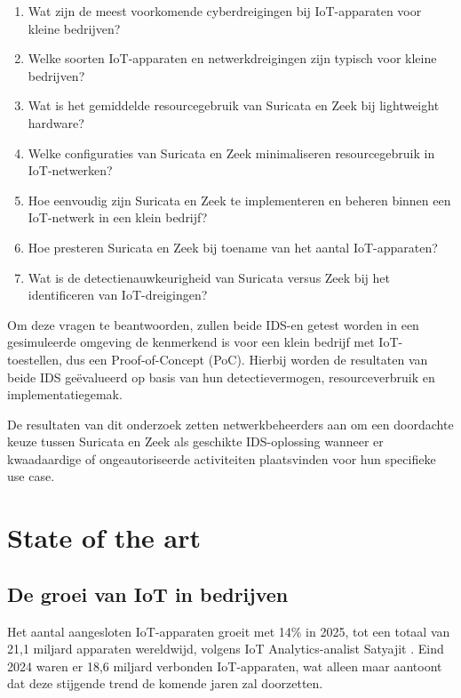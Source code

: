 \begin{enumerate}
    \item Wat zijn de meest voorkomende cyberdreigingen bij IoT-apparaten voor kleine bedrijven?
    \item Welke soorten IoT-apparaten en netwerkdreigingen zijn typisch voor kleine bedrijven?
    \item Wat is het gemiddelde resourcegebruik van Suricata en Zeek bij lightweight hardware?
    \item Welke configuraties van Suricata en Zeek minimaliseren resourcegebruik in IoT-netwerken?
    \item Hoe eenvoudig zijn Suricata en Zeek te implementeren en beheren binnen een IoT-netwerk in een klein bedrijf?
    \item Hoe presteren Suricata en Zeek bij toename van het aantal IoT-apparaten?
    \item Wat is de detectienauwkeurigheid van Suricata versus Zeek bij het identificeren van IoT-dreigingen?
\end{enumerate}

Om deze vragen te beantwoorden, zullen beide IDS-en getest worden in een gesimuleerde omgeving de kenmerkend is voor een klein bedrijf met IoT-toestellen, dus een Proof-of-Concept (PoC). Hierbij worden de resultaten van beide IDS geëvalueerd op basis van hun detectievermogen, resourceverbruik en implementatiegemak.

De resultaten van dit onderzoek zetten netwerkbeheerders aan om een doordachte keuze tussen Suricata en Zeek als geschikte IDS-oplossing wanneer er kwaadaardige of ongeautoriseerde activiteiten plaatsvinden voor hun specifieke use case.



\section{State of the art}%
\label{sec:literatuurstudie}

\subsection{De groei van IoT in bedrijven}

Het aantal aangesloten IoT-apparaten groeit met 14\% in 2025, tot een totaal van 21,1 miljard apparaten wereldwijd, volgens IoT Analytics-analist Satyajit \textcite{Sinha2025}. Eind 2024 waren er 18,6 miljard verbonden IoT-apparaten, wat alleen maar aantoont dat deze stijgende trend de komende jaren zal doorzetten. \\

